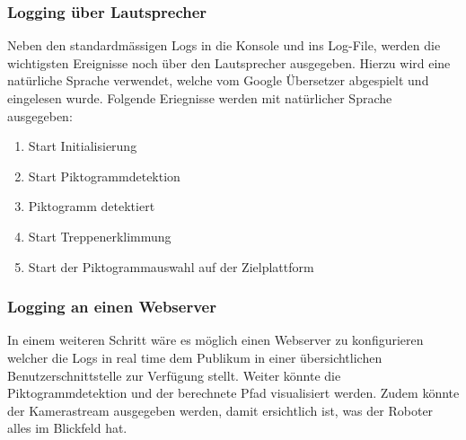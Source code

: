 \subsubsection{Logging über Lautsprecher}
Neben den standardmässigen Logs in die Konsole und ins Log-File, werden die wichtigsten Ereignisse noch über den Lautsprecher ausgegeben. Hierzu wird eine natürliche Sprache verwendet, welche vom Google Übersetzer abgespielt und eingelesen wurde. Folgende Eriegnisse werden mit natürlicher Sprache ausgegeben:
\begin{enumerate}
    \item Start Initialisierung
    \item Start Piktogrammdetektion
    \item Piktogramm detektiert
    \item Start Treppenerklimmung
    \item Start der Piktogrammauswahl auf der Zielplattform
\end{enumerate}

\subsubsection{Logging an einen Webserver}
In einem weiteren Schritt wäre es möglich einen Webserver zu konfigurieren welcher die Logs in real time dem Publikum in einer übersichtlichen Benutzerschnittstelle zur Verfügung stellt. Weiter könnte die Piktogrammdetektion und der berechnete Pfad visualisiert werden. Zudem könnte der Kamerastream ausgegeben werden, damit ersichtlich ist, was der Roboter alles im Blickfeld hat.
